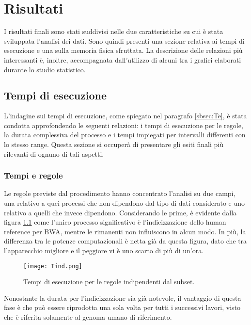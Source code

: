 \chapter{Risultati}
\label{cap:3}
I risultati finali sono stati suddivisi nelle due caratteristiche su cui è stata sviluppata l'analisi dei dati.
Sono quindi presenti una sezione relativa ai tempi di esecuzione e una sulla memoria fisica sfruttata. 
La descrizione delle relazioni più interessanti è, inoltre, accompagnata dall'utilizzo di alcuni tra i grafici elaborati durante lo studio statistico.

\section{Tempi di esecuzione}
L'indagine sui tempi di esecuzione, come spiegato nel paragrafo \ref{sbsec:Te}, è stata condotta approfondendo le seguenti relazioni: i tempi di esecuzione per le regole, la durata complessiva del processo e i tempi impiegati per intervalli differenti con lo stesso range. 
Questa sezione si occuperà di presentare gli esiti finali più rilevanti di ognuno di tali aspetti.

\subsection{Tempi e regole}
Le regole previste dal procedimento hanno concentrato l'analisi su due campi, una relativo a quei processi che non dipendono dal tipo di dati considerato e uno relativo a quelli che invece dipendono. 
Considerando le prime, è evidente dalla figura \ref{fig:Tind} come l'unico processo significativo è l'indicizzazione dello human reference per BWA, mentre le rimanenti non influiscono in alcun modo. 
In più, la differenza tra le potenze computazionali è netta già da questa figura, dato che tra l'apparecchio migliore e il peggiore vi è uno scarto di più di un'ora.
\begin{figure}[H]
\centering
\texttt{[image: Tind.png]}
\caption{Tempi di esecuzione per le regole indipendenti dal subset.}
\label{fig:Tind}
\end{figure}
Nonostante la durata per l'indicizzazione sia già notevole, il vantaggio di questa fase  è che può essere riprodotta una sola volta per tutti i successivi lavori, visto che è riferita solamente al genoma umano di riferimento.

